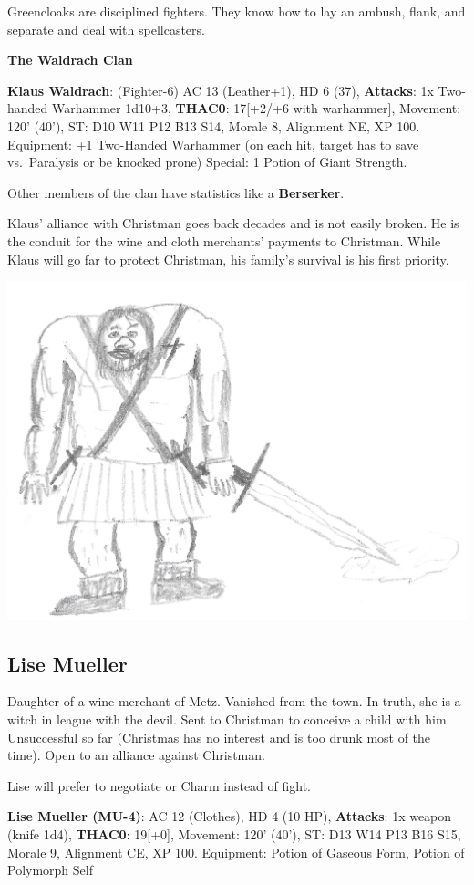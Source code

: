 \documentclass[
]{book}
\begin{document}
Greencloaks are disciplined fighters. They know how to lay an ambush, flank, and separate and deal with spellcasters.

\textbf{The Waldrach Clan}

\textbf{Klaus Waldrach}: (Fighter-6) AC 13 (Leather+1), HD 6 (37), \textbf{Attacks}: 1x Two-handed Warhammer 1d10+3, \textbf{THAC0}: 17{[}+2/+6 with warhammer{]}, Movement: 120' (40'), ST: D10 W11 P12 B13 S14, Morale 8, Alignment NE, XP 100. Equipment: +1 Two-Handed Warhammer (on each hit, target has to save vs.~Paralysis or be knocked prone) Special: 1 Potion of Giant Strength.

Other members of the clan have statistics like a \textbf{Berserker}.

Klaus' alliance with Christman goes back decades and is not easily broken. He is the conduit for the wine and cloth merchants' payments to Christman. While Klaus will go far to protect Christman, his family's survival is his first priority.

\begin{center}\includegraphics[width=0.5\linewidth]{graphics/klaus_waldrach} \end{center}

\subsection{Lise Mueller}\label{lise-mueller}

Daughter of a wine merchant of Metz. Vanished from the town. In truth, she is a witch in league with the devil. Sent to Christman to conceive a child with him. Unsuccessful so far (Christmas has no interest and is too drunk most of the time). Open to an alliance against Christman.

Lise will prefer to negotiate or Charm instead of fight.

\textbf{Lise Mueller (MU-4)}: AC 12 (Clothes), HD 4 (10 HP), \textbf{Attacks}: 1x weapon (knife 1d4), \textbf{THAC0}: 19{[}+0{]}, Movement: 120' (40'), ST: D13 W14 P13 B16 S15, Morale 9, Alignment CE, XP 100. Equipment: Potion of Gaseous Form, Potion of Polymorph Self
\end{document}
